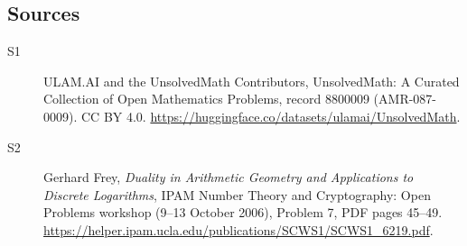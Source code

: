 \documentclass[11pt]{article}
\begin{document}
\subsection{Sources}
\begin{description}
\item[\hypertarget{source:8800009:1}{S1}] ULAM.AI and the UnsolvedMath Contributors, UnsolvedMath: A Curated Collection of Open Mathematics Problems, record 8800009 (AMR-087-0009). CC BY 4.0. \url{https://huggingface.co/datasets/ulamai/UnsolvedMath}.
\item[\hypertarget{source:8800009:2}{S2}] Gerhard Frey, \emph{Duality in Arithmetic Geometry and Applications to Discrete Logarithms}, IPAM Number Theory and Cryptography: Open Problems workshop (9--13 October 2006), Problem 7, PDF pages 45--49. \url{https://helper.ipam.ucla.edu/publications/SCWS1/SCWS1_6219.pdf}.
\end{description}
\label{end:8800009}
\end{document}

